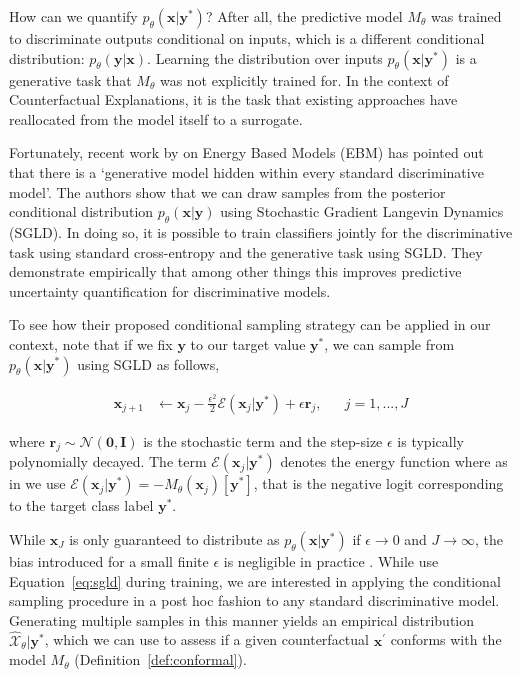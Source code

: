 \documentclass{article}
\begin{document}
How can we quantify $p_{\theta}(\mathbf{x}|\mathbf{y}^*)$? After all, the predictive model $M_{\theta}$ was trained to discriminate outputs conditional on inputs, which is a different conditional distribution: $p_{\theta}(\mathbf{y}|\mathbf{x})$. Learning the distribution over inputs $p_{\theta}(\mathbf{x}|\mathbf{y}^*)$ is a generative task that $M_{\theta}$ was not explicitly trained for. In the context of Counterfactual Explanations, it is the task that existing approaches have reallocated from the model itself to a surrogate. 

Fortunately, recent work by \citet{grathwohl2020your} on Energy Based Models (EBM) has pointed out that there is a `generative model hidden within every standard discriminative model'. The authors show that we can draw samples from the posterior conditional distribution $p_{\theta}(\mathbf{x}|\mathbf{y})$ using Stochastic Gradient Langevin Dynamics (SGLD). In doing so, it is possible to train classifiers jointly for the discriminative task using standard cross-entropy and the generative task using SGLD. They demonstrate empirically that among other things this improves predictive uncertainty quantification for discriminative models. 

To see how their proposed conditional sampling strategy can be applied in our context, note that if we fix $\mathbf{y}$ to our target value $\mathbf{y}^*$, we can sample from $p_{\theta}(\mathbf{x}|\mathbf{y}^*)$ using SGLD as follows, 

\begin{equation}\label{eq:sgld}
  \begin{aligned}
    \mathbf{x}_{j+1} &\leftarrow \mathbf{x}_j - \frac{\epsilon^2}{2} \mathcal{E}(\mathbf{x}_j|\mathbf{y}^*) + \epsilon \mathbf{r}_j, && j=1,...,J
  \end{aligned}
\end{equation}

where $\mathbf{r}_j \sim \mathcal{N}(\mathbf{0},\mathbf{I})$ is the stochastic term and the step-size $\epsilon$ is typically polynomially decayed. The term $\mathcal{E}(\mathbf{x}_j|\mathbf{y}^*)$ denotes the energy function where as in \citep{grathwohl2020your} we use $\mathcal{E}(\mathbf{x}_j|\mathbf{y}^*)=-M_{\theta}(\mathbf{x}_j)[\mathbf{y}^*]$, that is the negative logit corresponding to the target class label $\mathbf{y}^*$.

While $\mathbf{x}_J$ is only guaranteed to distribute as $p_{\theta}(\mathbf{x}|\mathbf{y}^*)$ if $\epsilon \rightarrow 0$ and $J \rightarrow \infty$, the bias introduced for a small finite $\epsilon$ is negligible in practice \citep{murphy2023probabilistic,grathwohl2020your}. While \citet{grathwohl2020your} use Equation~\ref{eq:sgld} during training, we are interested in applying the conditional sampling procedure in a post hoc fashion to any standard discriminative model. Generating multiple samples in this manner yields an empirical distribution $\hat{\mathcal{X}}_{\theta}|\mathbf{y}^*$, which we can use to assess if a given counterfactual $\mathbf{x}^{\prime}$ conforms with the model $M_{\theta}$ (Definition~\ref{def:conformal}). 
\end{document}
